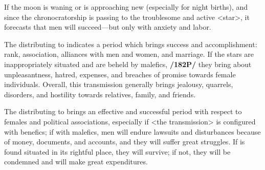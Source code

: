 If the moon is waning or is approaching new (especially for night births), and since the chronocratorship is passing to the troublesome and active <star>, it forecasts that men will succeed—but only with anxiety and labor.

The \Moon\xspace distributing to \Venus\xspace indicates a period which brings success and accomplishment: rank,
association, alliances with men and women, and marriage. If the stars are inappropriately situated and are beheld by malefics, \textbf{/182P/} they bring about unpleasantness, hatred, expenses, and breaches of promise towards female individuals. 
Overall, this transmission generally brings jealousy, quarrels, disorders, and hostility towards relatives, family, and friends.

The \Moon\xspace distributing to \Mercury\xspace brings an effective and successful period with respect to females and
political associations, especially if <the transmission> is configured with benefics; if with malefics, men will endure lawsuits and disturbances because of money, documents, and accounts, and they will suffer great struggles. If \Mercury\xspace is found situated in its rightful place, they will survive; if not, they will be condemned and will make great expenditures.

\newpage